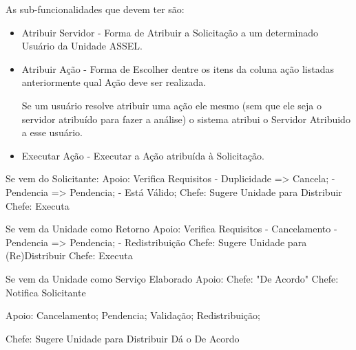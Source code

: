 	
	As sub-funcionalidades que devem ter são:
	\begin{itemize}
		\item Atribuir Servidor - Forma de Atribuir a Solicitação a um determinado Usuário da Unidade ASSEL.
		
		\item Atribuir Ação - Forma de Escolher dentre os itens da coluna ação listadas anteriormente qual Ação deve ser realizada.
		
		Se um usuário resolve atribuir uma ação ele mesmo (sem que ele seja o servidor atribuído para fazer a análise)  o sistema atribui o Servidor Atribuido a esse usuário.
		
		
		\item Executar Ação - Executar a Ação atribuída à Solicitação.		
	\end{itemize}
		
	


	Se vem do Solicitante:
		Apoio: Verifica Requisitos
			- Duplicidade => Cancela;
			- Pendencia => Pendencia;
			- Está Válido;
		Chefe: Sugere Unidade para Distribuir
		Chefe: Executa
		
	Se vem da Unidade como Retorno
		Apoio: Verifica Requisitos
			- Cancelamento
			- Pendencia => Pendencia;
			- Redistribuição
			Chefe: Sugere Unidade para (Re)Distribuir
			Chefe: Executa
			
	Se vem da Unidade como Serviço Elaborado
		Apoio:  
		Chefe: "De Acordo"
		Chefe: Notifica Solicitante
		
		
		
	Apoio:
		Cancelamento;
		Pendencia;
		Validação;
		Redistribuição;
	
	Chefe: 
		Sugere Unidade para Distribuir
		Dá o De Acordo
